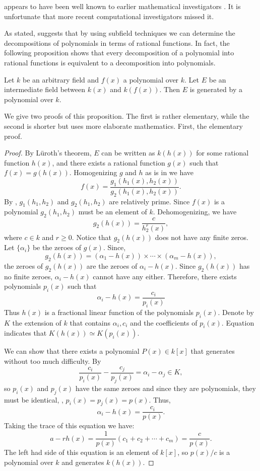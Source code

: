  appears to have been well known to
earlier mathematical investigators \cite{Dorey74,Fried74}.  It is
unfortunate that more recent computational investigators missed it.

As stated,  suggests that by using
subfield techniques we can determine the decompositions of polynomials
in terms of rational functions.  In fact, the following proposition
shows that every decomposition of a polynomial into rational functions
is equivalent to a decomposition into polynomials. 

\begin{proposition}
\label{Poly:Decomp:Corres:Prop}
Let $k$ be an arbitrary field and $f(x)$ a polynomial over $k$.  Let
$E$ be an intermediate field between $k(x)$ and $k(f(x))$.  Then $E$
is generated by a polynomial over $k$.
\end{proposition}

We give two proofs of this proposition.  The first is rather
elementary, while the second is shorter but uses more elaborate
mathematics.  First, the elementary proof.

\begin{proof}
By L\"uroth's theorem, $E$ can be written as $k(h(x))$ for some
rational function $h(x)$, and there exists a rational function $g(x)$
such that $f(x) = g(h(x))$.  Homogenizing $g$ and $h$ as is in
 we have
\[
f(x) = \frac{g_1(h_1(x), h_2(x))}{g_2(h_1(x), h_2(x))}.
\]
By , $g_1(h_1, h_2)$ and $g_2(h_1, h_2)$ are
relatively prime.  Since $f(x)$ is a polynomial $g_2(h_1, h_2)$ must
be an element of $k$.  Dehomogenizing, we have
\[
g_2(h(x)) = \frac{c}{h_2^r(x)},
\]
where $c \in k$ and $r \ge 0$.  Notice that $g_2(h(x))$ does not have
any finite zeros.  Let $\{\alpha_i\}$ be the zeroes of $g(x)$.  Since,
\[
g_2(h(x)) = (\alpha_1 - h(x)) \times \cdots \times (\alpha_m - h(x)),
\]
the zeroes of $g_2(h(x))$ are the zeroes of $\alpha_i - h(x)$.  Since
$g_2(h(x))$ has no finite zeroes, $\alpha_i - h(x)$ cannot have any
either.  Therefore, there exists polynomials $p_i(x)$ such that
\begin{equation}
\label{Poly:Corres:Eq}
\alpha_i - h(x) = \frac{c_i}{p_i(x)}
\end{equation}
Thus $h(x)$ is a fractional linear function of the polynomials
$p_i(x)$.  Denote by $K$ the extension of $k$ that contains $\alpha_i,
c_i$ and the coefficients of $p_i(x)$.  Equation
 indicates that $K(h(x)) \simeq K(p_i(x))$.  

We can show that there exists a polynomial $P(x) \in k[x]$ that
generates without too much difficulty.  By 
\[
\frac{c_i}{p_i(x)}  - \frac{c_j}{p_j(x)} = \alpha_i - \alpha_j \in K,
\]
so $p_i(x)$ and $p_j(x)$ have the same zeroes and since they are
polynomials, they must be identical, \ie, $p_i(x) = p_j(x) = p(x)$.
Thus,
\[
\alpha_i - h(x) = \frac{c_i}{p(x)}.
\]
Taking the trace of this equation we have: 
\[
a - r h(x) = \frac{1}{p(x)} \left( c_1 +c_2 + \cdots + c_m\right) 
  = \frac{c}{p(x)}.
\]
The left had side of this equation is an element of $k[x]$, so
$p(x)/c$ is a polynomial over $k$ and generates $k(h(x))$.
\end{proof}

